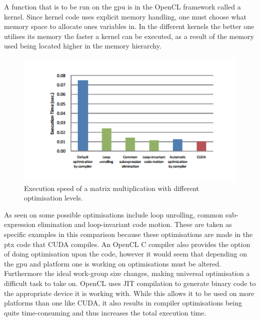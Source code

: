 
A function that is to be run on the \acrshort{gpu} is in the OpenCL framework called a kernel.
Since kernel code uses explicit memory handling, one must choose what memory space to allocate ones variables in.
In the different kernels the better one utilises its memory the faster a kernel can be executed, as a result of the memory used being located higher in the memory hierarchy.
\begin{figure}[h!]
\centering
 \includegraphics[width=1\textwidth]{figures/OpenCLOptimisation.png} %
\caption{Execution speed of a matrix multiplication with different optimisation levels. \citep{CUDAOpenCLOptimisation}}\label{image:OpenCLOptCompare}
\vspace{-15pt}
\end{figure}
As seen on  some possible optimisations include loop unrolling, common sub-expression elimination and loop-invariant code motion. 
These are taken as specific examples in this comparison because these optimisations are made in the \acrlong{ptx} code that CUDA compiles.
An OpenCL C compiler also provides the option of doing optimisation upon the code, however it would seem that depending on the \acrshort{gpu} and platform one is working on optimisations must be altered.
Furthermore the ideal work-group size changes, making universal optimisation a difficult task to take on.
OpenCL uses JIT compilation to generate binary code to the appropriate device it is working with.
While this allows it to be used on more platforms than one like CUDA, it also results in compiler optimisations being quite time-consuming and thus increases the total execution time.\citep{CUDAOpenCLOptimisation}